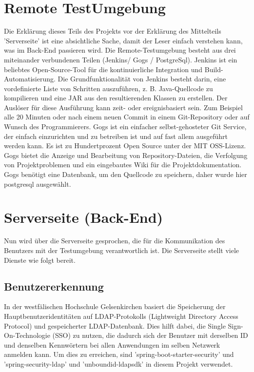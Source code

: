\documentclass[a4paper,12pt,oneside]{book}
\begin{document}
\section{Remote TestUmgebung}
Die Erklärung dieses Teils des Projekts vor der Erklärung des Mittelteils 'Serverseite' ist eine absichtliche Sache, damit der Leser einfach verstehen kann, was im Back-End passieren wird.
\newline
Die Remote-Testumgebung besteht aus drei miteinander verbundenen Teilen (Jenkins/ Gogs / PostgreSql).
\newline
Jenkins ist ein beliebtes Open-Source-Tool für die kontinuierliche Integration und Build-Automatisierung. Die Grundfunktionalität von Jenkins besteht darin, eine vordefinierte Liste von Schritten auszuführen, z. B. Java-Quellcode zu kompilieren und eine JAR aus den resultierenden Klassen zu erstellen. Der Auslöser für diese Ausführung kann zeit- oder ereignisbasiert sein. Zum Beispiel alle 20 Minuten oder nach einem neuen Commit in einem Git-Repository oder auf Wunsch des Programmierers. 
\newline
Gogs ist ein einfacher selbst-gehosteter Git Service, der einfach einzurichten und zu betreiben ist und auf fast allem ausgeführt werden kann. Es ist zu Hundertprozent Open Source unter der MIT OSS-Lizenz. Gogs bietet die Anzeige und Bearbeitung von Repository-Dateien, die Verfolgung von Projektproblemen und ein eingebautes Wiki für die Projektdokumentation.
Gogs benötigt eine Datenbank, um den Quellcode zu speichern, daher wurde hier postgresql ausgewählt.

\section{Serverseite (Back-End)}
Nun wird über die Serverseite gesprochen, die für die Kommunikation des Benutzers mit der Testumgebung verantwortlich ist.
\newline
Die Serverseite stellt viele Dienste wie folgt bereit.
\subsection{Benutzererkennung} In der westfälischen Hochschule Gelsenkirchen basiert die Speicherung der Hauptbenutzeridentitäten auf LDAP-Protokolls (Lightweight Directory Access Protocol) und gespeicherter LDAP-Datenbank. Dies hilft dabei, die Single Sign-On-Technologie (SSO) zu nutzen, die dadurch sich der Benutzer mit derselben ID und denselben Kennwörtern bei allen Anwendungen im selben Netzwerk anmelden kann. Um dies zu erreichen, sind 'spring-boot-starter-security' und 'spring-security-ldap' und 'unboundid-ldapsdk' in diesem Projekt verwendet.
\end{document}
